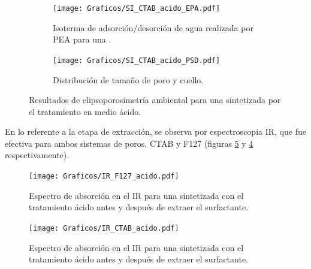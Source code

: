 {		\pagebreak

		\begin{figure}[!ht]
		  	\begin{subfigure}[t]{0.495\textwidth}
		  	\texttt{[image: Graficos/SI\_CTAB\_acido\_EPA.pdf]}
			\caption[Elipsoporsimetría \pdmC\space tratamiento ácido.]{Isoterma de adsorción/desorción de agua realizada por PEA para una \pdmC.}
			\label{fig:CTAB_acido_EPA}
			\end{subfigure}
			\begin{subfigure}[t]{0.495\textwidth}
		  	\texttt{[image: Graficos/SI\_CTAB\_acido\_PSD.pdf]}
			\caption{Distribución de tamaño de poro y cuello.\\ }
			\label{fig:CTAB_acido_PSD}
			\end{subfigure}
			\caption[Elipsoporosimetría \pdmC\space tratamiento ácido.]{Resultados de elipsoporosimetría ambiental para una \pdmC\space sintetizada por el tratamiento en medio ácido.}
			\end{figure}

		En lo referente a la etapa de extracción, se observa por espectroscopia IR, que fue efectiva para ambos sistemas de poros, CTAB y F127 (figuras \ref{fig:IR_CTAB_acido} y \ref{fig:IR_F127_acido} respectivamente).	
			
		\begin{figure}[!ht]
			\begin{center}
			\texttt{[image: Graficos/IR\_F127\_acido.pdf]}
			\caption[FTIR \pdmF\space tratamiento ácido.]{Espectro de absorción en el IR para una \pdmF\space sintetizada con el tratamiento ácido antes y después de extraer el surfactante.}
			\label{fig:IR_F127_acido}
			\end{center}
			\end{figure}
		
		\pagebreak

		 \begin{figure}[!ht]
			\begin{center}
			\texttt{[image: Graficos/IR\_CTAB\_acido.pdf]}
			\caption[FTIR \pdmC\space tratamiento ácido.]{Espectro de absorción en el IR para una \pdmC\space sintetizada con el tratamiento ácido antes y después de extraer el surfactante.}
			\label{fig:IR_CTAB_acido}
			\end{center}
			\end{figure}
 	
}
